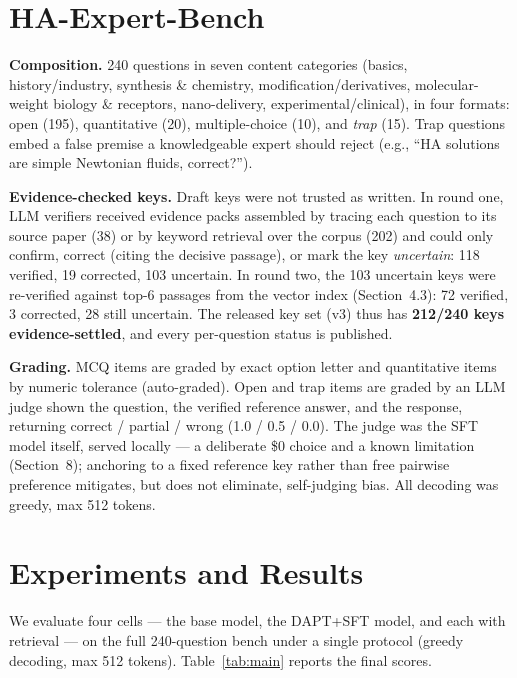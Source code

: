 \documentclass[11pt]{article}
\begin{document}
\section{HA-Expert-Bench}

\textbf{Composition.} 240 questions in seven content categories (basics,
history/industry, synthesis \& chemistry, modification/derivatives,
molecular-weight biology \& receptors, nano-delivery,
experimental/clinical), in four formats: open (195), quantitative (20),
multiple-choice (10), and \emph{trap} (15). Trap questions embed a false
premise a knowledgeable expert should reject (e.g., ``HA solutions are
simple Newtonian fluids, correct?'').

\textbf{Evidence-checked keys.} Draft keys were not trusted as written. In
round one, LLM verifiers received evidence packs assembled by tracing each
question to its source paper (38) or by keyword retrieval over the corpus
(202) and could only confirm, correct (citing the decisive passage), or
mark the key \emph{uncertain}: 118 verified, 19 corrected, 103 uncertain.
In round two, the 103 uncertain keys were re-verified against top-6
passages from the vector index (Section~4.3): 72 verified, 3 corrected,
28 still uncertain. The released key set (v3) thus has \textbf{212/240 keys
evidence-settled}, and every per-question status is published.

\textbf{Grading.} MCQ items are graded by exact option letter and
quantitative items by numeric tolerance (auto-graded). Open and trap
items are graded by an LLM judge shown the question, the verified
reference answer, and the response, returning correct / partial / wrong
(1.0 / 0.5 / 0.0). The judge was the SFT model itself, served locally ---
a deliberate \$0 choice and a known limitation (Section~8); anchoring to a
fixed reference key rather than free pairwise preference mitigates, but
does not eliminate, self-judging bias. All decoding was greedy, max 512
tokens.

\section{Experiments and Results}

We evaluate four cells --- the base model, the DAPT+SFT model, and each
with retrieval --- on the full 240-question bench under a single protocol
(greedy decoding, max 512 tokens). Table~\ref{tab:main} reports the final
scores.
\end{document}
